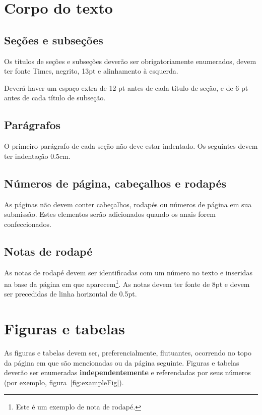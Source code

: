 \documentclass[12pt]{article}
\begin{document}
\section{Corpo do texto}

\subsection{Seções e subseções}
\label{sec:secoes}

Os títulos de seções e subseções deverão ser obrigatoriamente
enumerados, devem ter fonte Times, negrito, 13pt e alinhamento à
esquerda.

Deverá haver um espaço extra de 12 pt antes de cada título de seção, e
de 6 pt antes de cada título de subseção.

\subsection{Parágrafos}
\label{sec:paragrafos}

O primeiro parágrafo de cada seção não deve estar indentado. Os
seguintes devem ter indentação 0.5cm.

\subsection{Números de página, cabeçalhos e rodapés}

As páginas não devem conter cabeçalhos, rodapés ou números de página em sua submissão.
Estes elementos serão adicionados quando os anais forem
confeccionados.

\subsection{Notas de rodapé}

As notas de rodapé devem ser identificadas com um número no texto e
inseridas na base da página em que aparecem\footnote{Este é um exemplo
  de nota de rodapé.}. As notas devem ter fonte de 8pt e devem ser
precedidas de linha horizontal de 0.5pt.

\section{Figuras e tabelas}
\label{sec:figuras-e-tabelas}

As figuras e tabelas devem ser, preferencialmente, flutuantes,
ocorrendo no topo da página em que são mencionadas ou da página
seguinte. Figuras e tabelas deverão ser enumeradas
\textbf{independentemente} e referendadas por seus números (por
exemplo, figura~\ref{fig:exampleFig}).
\end{document}
